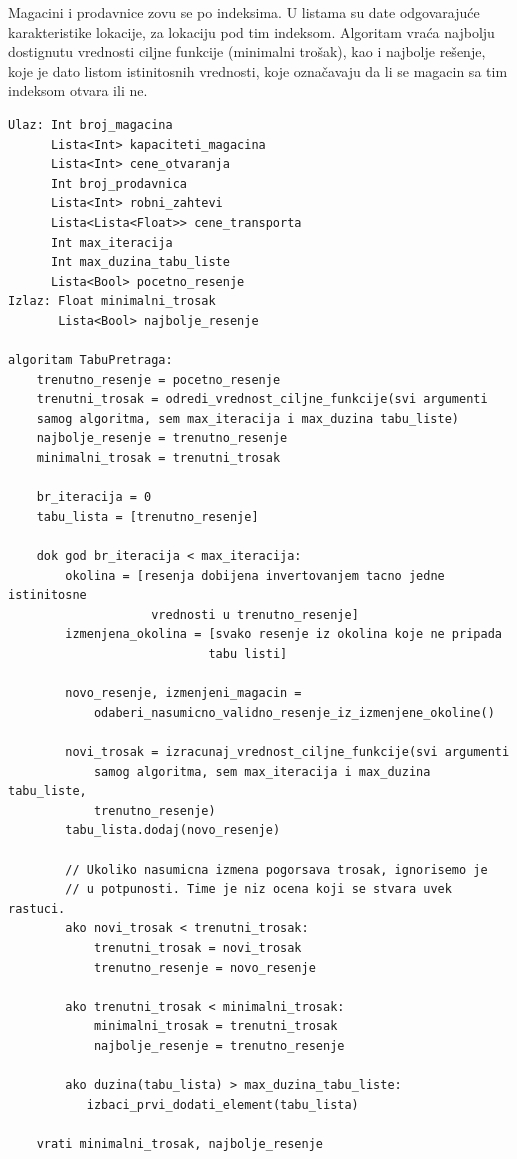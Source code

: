 \documentclass[a4paper]{article}
\begin{document}
Magacini i prodavnice zovu se po indeksima. U listama su date odgovarajuće karakteristike lokacije, za lokaciju pod tim indeksom. Algoritam vraća najbolju dostignutu vrednosti ciljne funkcije (minimalni trošak), kao i najbolje rešenje, koje je dato listom istinitosnih vrednosti, koje označavaju da li se magacin sa tim indeksom otvara ili ne.

\begin{lstlisting}
Ulaz: Int broj_magacina
      Lista<Int> kapaciteti_magacina
      Lista<Int> cene_otvaranja
      Int broj_prodavnica
      Lista<Int> robni_zahtevi
      Lista<Lista<Float>> cene_transporta
      Int max_iteracija
      Int max_duzina_tabu_liste
      Lista<Bool> pocetno_resenje
Izlaz: Float minimalni_trosak
       Lista<Bool> najbolje_resenje

algoritam TabuPretraga:
    trenutno_resenje = pocetno_resenje
    trenutni_trosak = odredi_vrednost_ciljne_funkcije(svi argumenti
    samog algoritma, sem max_iteracija i max_duzina tabu_liste)
    najbolje_resenje = trenutno_resenje
    minimalni_trosak = trenutni_trosak
    
    br_iteracija = 0
    tabu_lista = [trenutno_resenje]
    
    dok god br_iteracija < max_iteracija:
        okolina = [resenja dobijena invertovanjem tacno jedne istinitosne
                    vrednosti u trenutno_resenje]
        izmenjena_okolina = [svako resenje iz okolina koje ne pripada 
                            tabu listi]
        
        novo_resenje, izmenjeni_magacin =
            odaberi_nasumicno_validno_resenje_iz_izmenjene_okoline()
        
        novi_trosak = izracunaj_vrednost_ciljne_funkcije(svi argumenti
            samog algoritma, sem max_iteracija i max_duzina tabu_liste,
            trenutno_resenje)
        tabu_lista.dodaj(novo_resenje)
        
        // Ukoliko nasumicna izmena pogorsava trosak, ignorisemo je
        // u potpunosti. Time je niz ocena koji se stvara uvek rastuci.
        ako novi_trosak < trenutni_trosak:
            trenutni_trosak = novi_trosak
            trenutno_resenje = novo_resenje
        
        ako trenutni_trosak < minimalni_trosak:
            minimalni_trosak = trenutni_trosak
            najbolje_resenje = trenutno_resenje
        
        ako duzina(tabu_lista) > max_duzina_tabu_liste:
           izbaci_prvi_dodati_element(tabu_lista)
            
    vrati minimalni_trosak, najbolje_resenje
\end{lstlisting}
\end{document}
